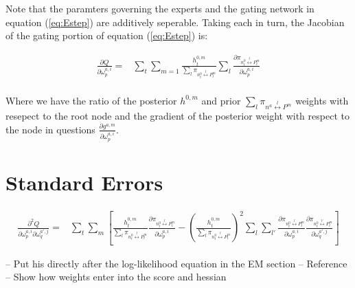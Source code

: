 \documentclass[12pt]{article}
\begin{document}
Note that the paramters governing the experts and the gating network in
equation (\ref{eq:Estep}) are additively seperable. Taking each in turn, the
Jacobian of the gating portion of equation (\ref{eq:Estep}) is:

\begin{equation} \label{eq:gateJacobian}
  \begin{split}
    \frac{\partial Q}{\partial \omega^{a,i}_{p}} =& \sum_{t} \sum_{m=1}  \frac{h^{0,m}_{t}}{\sum_{l} \pi_{n^{0}_{t} \overset{l}{\longleftrightarrow} P^{m}_{t}}} \sum_{l} \frac{\partial \pi_{n^{0}_{t} \overset{l}{\longleftrightarrow} P^{m}_{t}}}{\partial \omega^{a,i}_{p}} \\
  \end{split}
\end{equation}

Where we have the ratio of the posterior $h^{0,m}$ and prior 
$\sum_{l} \pi_{n^{a} \overset{l}{\longleftrightarrow} P^{m}}$ weights with resepect
to the root node and the gradient of the posterior weight with respect to the node
in questions $\frac{\partial g^{a,m}}{\partial \omega^{a,i}_{p}}$.





\section{Standard Errors}

\begin{equation} \label{eq:gateHessian}
  \begin{split}
    \frac{\partial^{2} Q}{\partial \omega^{a,i}_{p} \partial \omega^{a',j}_{q}} =& \sum_{t} \sum_{m} \left[  \frac{h^{0,m}_{t}}{\sum_{l} \pi_{n^{0}_{t} \overset{l}{\longleftrightarrow} P^{m}_{t}}} \frac{\partial \pi_{n^{0}_{t} \overset{l}{\longleftrightarrow} P^{m}_{t}}}{\partial \omega^{a,i}_{p}} - \left( \frac{h^{0,m}_{t}}{\sum_{l} \pi_{n^{0}_{t} \overset{l}{\longleftrightarrow} P^{m}_{t}}} \right)^{2} \sum_{l} \sum_{l'} \frac{\partial \pi_{n^{0}_{t} \overset{l}{\longleftrightarrow} P^{m}_{t}}}{\partial \omega^{a,i}_{p}}  \frac{\partial \pi_{n^{0}_{t} \overset{l'}{\longleftrightarrow} P^{m}_{t}}}{\partial \omega^{a',j}_{q}} \right]
  \end{split}
\end{equation}

-- Put his directly after the log-likelihood equation in the EM section
-- Reference \cite{MengRubinSEM1991}
-- Show how weights enter into the score and hessian
\end{document}
